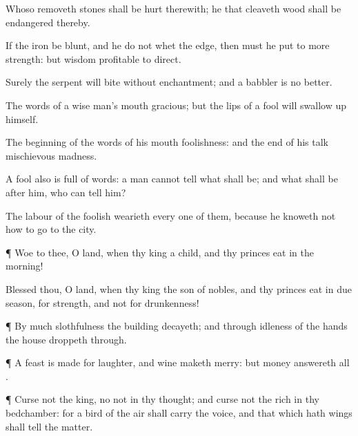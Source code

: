 {Whoso
removeth
stones shall be
hurt therewith;
{} he that
cleaveth
wood shall be
endangered thereby.

If the
iron be
blunt, and he do not
whet the
edge, then must he
put to more
strength: but
wisdom
{}
profitable to
direct.

Surely the
serpent will
bite without
enchantment; and a
babbler is no
better.


\par }{\PP {}The
words of a wise
man’s
mouth
{}
gracious; but the
lips of a
fool will swallow
up himself.

The
beginning of the
words of his
mouth
{}
foolishness: and the
end of his
talk
{}
mischievous
madness.

A
fool also is
full of
words: a
man cannot
tell what shall be; and what shall be
after him, who can
tell him?

The
labour of the
foolish
wearieth every one of them, because he
knoweth not how to
go to the
city.


\par }{\PP {}¶
Woe to thee, O
land, when thy
king
{} a
child, and thy
princes
eat in the
morning!

Blessed
{} thou, O
land, when thy
king
{} the
son of
nobles, and thy
princes
eat in due
season, for
strength, and not for
drunkenness!


\par }{\PP {}¶ By much
slothfulness the
building
decayeth; and through
idleness of the
hands the
house droppeth
through.


\par }{\PP {}¶ A
feast is
made for
laughter, and
wine maketh
merry: but
money
answereth all
{}.


\par }{\PP {}¶
Curse not the
king, no not in thy
thought; and
curse not the
rich in thy
bedchamber: for a
bird of the
air shall
carry the
voice, and that which
hath
wings shall
tell the
matter.




}
